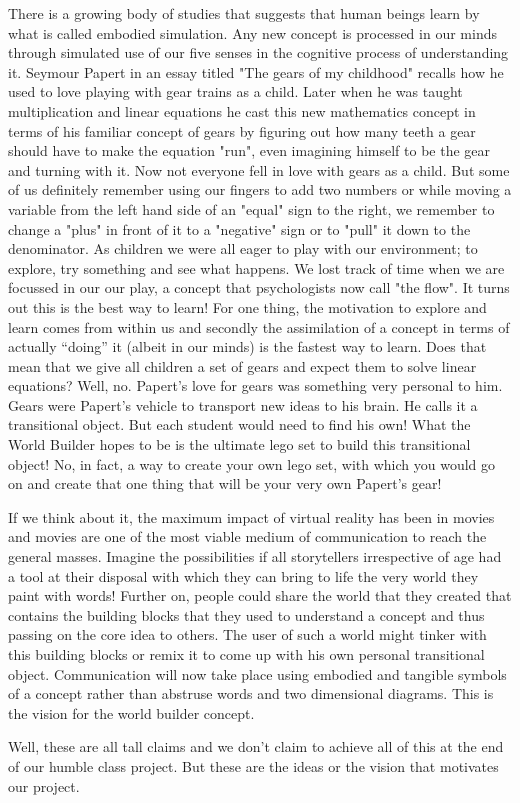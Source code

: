 There is a growing body of studies that suggests that human beings learn by what is called embodied simulation.
Any new concept is processed in our minds through simulated use of our five senses in the cognitive process of understanding it.
Seymour Papert in an essay titled "The gears of my childhood" recalls how he used to love playing with gear trains as a child.
Later when he was taught multiplication and linear equations he cast this new mathematics concept in terms of his familiar concept of gears by figuring out how many teeth a gear should have to make the equation "run", even imagining himself to be the gear and turning with it.
Now not everyone fell in love with gears as a child.
But some of us definitely remember using our fingers to add two numbers or while moving a variable from the left hand side of an "equal" sign to the right, we remember to change a "plus" in front of it to a "negative" sign or to "pull" it down to the denominator.
As children we were all eager to play with our environment; to explore, try something and see what happens.
We lost track of time when we are focussed in our our play, a concept that psychologists now call "the flow".
It turns out this is the best way to learn!
For one thing, the motivation to explore and learn comes from within us and secondly the assimilation of a concept in terms of actually ``doing'' it (albeit in our minds) is the fastest way to learn.
Does that mean that we give all children a set of gears and expect them to solve linear equations?
Well, no.
Papert's love for gears was something very personal to him.
Gears were Papert's vehicle to transport new ideas to his brain.
He calls it a transitional object.
But each student would need to find his own!
What the World Builder hopes to be is the ultimate lego set to build this transitional object!
No, in fact, a way to create your own lego set, with which you would go on and create that one thing that will be your very own Papert's gear! 

If we think about it, the maximum impact of virtual reality has been in movies and movies are one of the most viable medium of communication to reach the general masses.
Imagine the possibilities if all storytellers irrespective of age had a tool at their disposal with which they can bring to life the very world they paint with words!
Further on, people could share the world that they created that contains the building blocks that they used to understand a concept and thus passing on the core idea to others.
The user of such a world might tinker with this building blocks or remix it to come up with his own personal transitional object. Communication will now take place using embodied and tangible symbols of a concept rather than abstruse words and two dimensional diagrams.
This is the vision for the world builder concept.

Well, these are all tall claims and we don't claim to achieve all of this at the end of our humble class project.
But these are the ideas or the vision that motivates our project.